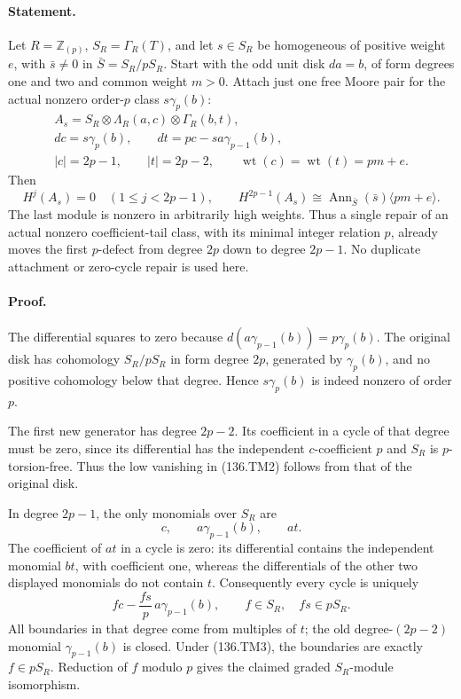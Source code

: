 \paragraph{Statement.}
Let \(R=\mathbb Z_{(p)}\), \(S_R=\Gamma_R(T)\), and let
\(s\in S_R\) be homogeneous of positive weight \(e\), with
\(\bar s\neq0\) in \(\bar S=S_R/pS_R\). Start with the odd
unit disk \(da=b\), of form degrees one and two and common
weight \(m>0\). Attach just one free Moore pair for the actual
nonzero order-\(p\) class \(s\gamma_p(b)\):
\[
 \begin{gathered}
 A_s=S_R\otimes\Lambda_R(a,c)\otimes\Gamma_R(b,t),\\
 dc=s\gamma_p(b),\qquad
 dt=pc-s a\gamma_{p-1}(b),\\
 |c|=2p-1,\qquad |t|=2p-2,\qquad
 \operatorname{wt}(c)=\operatorname{wt}(t)=pm+e.
 \end{gathered}
 \tag{136.TM1}
\]
Then
\[
 H^j(A_s)=0\quad(1\leq j<2p-1),\qquad
 H^{2p-1}(A_s)
   \cong\operatorname{Ann}_{\bar S}(\bar s)
                       \langle pm+e\rangle.
 \tag{136.TM2}
\]
The last module is nonzero in arbitrarily high weights.
Thus a single repair of an actual nonzero coefficient-tail class,
with its minimal integer relation \(p\), already moves the first
\(p\)-defect from degree \(2p\) down to degree \(2p-1\).
No duplicate attachment or zero-cycle repair is used here.

\paragraph{Proof.}
The differential squares to zero because
\(d(a\gamma_{p-1}(b))=p\gamma_p(b)\).
The original disk has cohomology \(S_R/pS_R\) in form degree
\(2p\), generated by \(\gamma_p(b)\), and no positive
cohomology below that degree. Hence \(s\gamma_p(b)\) is indeed
nonzero of order \(p\).

The first new generator has degree \(2p-2\). Its coefficient
in a cycle of that degree must be zero, since its differential
has the independent \(c\)-coefficient \(p\) and \(S_R\) is
\(p\)-torsion-free. Thus the low vanishing in (136.TM2) follows
from that of the original disk.

In degree \(2p-1\), the only monomials over \(S_R\) are
\[
                  c,\qquad a\gamma_{p-1}(b),\qquad at.
\]
The coefficient of \(at\) in a cycle is zero: its differential
contains the independent monomial \(bt\), with coefficient one,
whereas the differentials of the other two displayed monomials
do not contain \(t\). Consequently every cycle is uniquely
\[
        f c-\frac{fs}{p}\,a\gamma_{p-1}(b),
                       \qquad f\in S_R,\quad fs\in pS_R.
 \tag{136.TM3}
\]
All boundaries in that degree come from multiples of \(t\);
the old degree-\((2p-2)\) monomial \(\gamma_{p-1}(b)\) is
closed. Under (136.TM3), the boundaries are exactly \(f\in pS_R\).
Reduction of \(f\) modulo \(p\) gives the claimed graded
\(S_R\)-module isomorphism.

